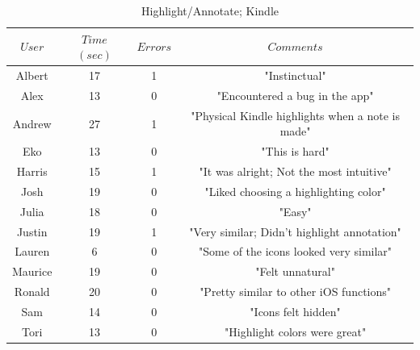 \documentclass[11pt, oneside]{article}
\begin{document}
\begin{table}[!hbt]
\begin{center}
\caption{Highlight/Annotate; Kindle}
\label{tab:task3learnKindle}
\begin{tabular}{|c|c|c|c|}
\hline
$User$ & $Time$ $(sec)$ & $Errors$ & $Comments$\\
\hline
Albert & 17 & 1 & "Instinctual"\\
\hline
Alex & 13 & 0 & "Encountered a bug in the app"\\
\hline
Andrew & 27 & 1 & "Physical Kindle highlights when a note is made"\\
\hline
Eko & 13 & 0 & "This is hard"\\
\hline
Harris & 15 & 1 & "It was alright; Not the most intuitive"\\
\hline
Josh & 19 & 0 & "Liked choosing a highlighting color"\\
\hline
Julia & 18 & 0 & "Easy"\\
\hline
Justin & 19 & 1 & "Very similar; Didn't highlight annotation"\\
\hline
Lauren & 6 & 0 & "Some of the icons looked very similar"\\
\hline
Maurice & 19 & 0 & "Felt unnatural"\\
\hline
Ronald & 20 & 0 & "Pretty similar to other iOS functions"\\
\hline
Sam & 14 & 0 & "Icons felt hidden"\\
\hline
Tori & 13 & 0 & "Highlight colors were great"\\
\hline
\end{tabular}
\end{center}
\end{table}
\end{document}
